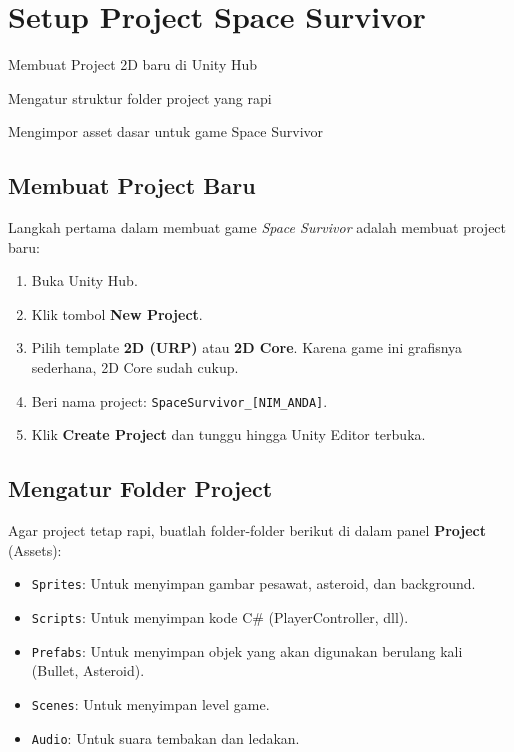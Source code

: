 
\section{Setup Project Space Survivor}

\begin{learningoutcomes}
\item Membuat Project 2D baru di Unity Hub
\item Mengatur struktur folder project yang rapi
\item Mengimpor asset dasar untuk game Space Survivor
\end{learningoutcomes}

\subsection{Membuat Project Baru}

Langkah pertama dalam membuat game \textit{Space Survivor} adalah membuat project baru:

\begin{enumerate}
    \item Buka Unity Hub.
    \item Klik tombol \textbf{New Project}.
    \item Pilih template \textbf{2D (URP)} atau \textbf{2D Core}. Karena game ini grafisnya sederhana, 2D Core sudah cukup.
    \item Beri nama project: \texttt{SpaceSurvivor\_[NIM\_ANDA]}.
    \item Klik \textbf{Create Project} dan tunggu hingga Unity Editor terbuka.
\end{enumerate}

\subsection{Mengatur Folder Project}

Agar project tetap rapi, buatlah folder-folder berikut di dalam panel \textbf{Project} (Assets):

\begin{itemize}
    \item \texttt{Sprites}: Untuk menyimpan gambar pesawat, asteroid, dan background.
    \item \texttt{Scripts}: Untuk menyimpan kode C\# (PlayerController, dll).
    \item \texttt{Prefabs}: Untuk menyimpan objek yang akan digunakan berulang kali (Bullet, Asteroid).
    \item \texttt{Scenes}: Untuk menyimpan level game.
    \item \texttt{Audio}: Untuk suara tembakan dan ledakan.
\end{itemize}

